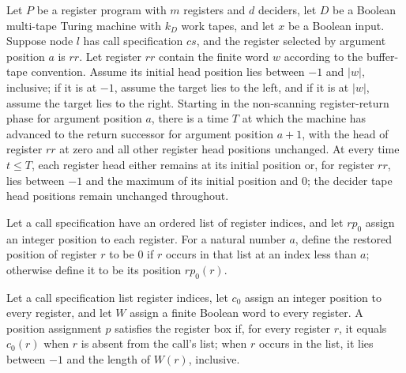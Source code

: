 \begin{lemma}
\label{Complexity.LogProg.retR_run}
\leanok
{}
Let $P$ be a register program with $m$ registers and $d$ deciders, let $D$ be a Boolean
multi-tape Turing machine with $k_D$ work tapes, and let $x$ be a Boolean input. Suppose
node $l$ has call specification $cs$, and the register selected by argument position $a$
is $rr$. Let register $rr$ contain the finite word $w$ according to the buffer-tape
convention. Assume its initial head position lies between $-1$ and $|w|$, inclusive; if
it is at $-1$, assume the target lies to the left, and if it is at $|w|$, assume the
target lies to the right. Starting in the non-scanning register-return phase for
argument position $a$, there is a time $T$ at which the machine has advanced to the
return successor for argument position $a+1$, with the head of register $rr$ at zero and
all other register head positions unchanged. At every time $t\le T$, each register head
either remains at its initial position or, for register $rr$, lies between $-1$ and the
maximum of its initial position and $0$; the decider tape head positions remain
unchanged throughout.
\end{lemma}

\begin{definition}
\label{Complexity.LogProg.retPos}
\leanok
{}
Let a call specification have an ordered list of register indices, and let $rp_0$ assign
an integer position to each register. For a natural number $a$, define the restored
position of register $r$ to be $0$ if $r$ occurs in that list at an index less than $a$;
otherwise define it to be its position $rp_0(r)$.
\end{definition}

\begin{definition}
\label{Complexity.LogProg.RegBox}
\leanok
{}
Let a call specification list register indices, let $c_0$ assign an integer position to
every register, and let $W$ assign a finite Boolean word to every register. A position
assignment $p$ satisfies the register box if, for every register $r$, it equals $c_0(r)$
when $r$ is absent from the call's list; when $r$ occurs in the list, it lies between
$-1$ and the length of $W(r)$, inclusive.
\end{definition}

